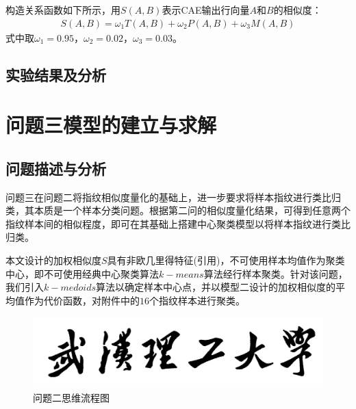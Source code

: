 \documentclass{whutmod}
\begin{document}
			构造关系函数如下所示，用$S(A,B)$表示CAE输出行向量$A$和$B$的相似度：
			\begin{gather}
			S(A,B)=\omega_1 T(A,B)+\omega_2 P(A,B)+\omega_3 M(A,B)
			\end{gather}
			式中取$\omega_1=0.95$，$\omega_2=0.02$，$\omega_3=0.03$。



        \subsection{实验结果及分析}
        


    \section{问题三模型的建立与求解}

  	\subsection{问题描述与分析}
  	问题三在问题二将指纹相似度量化的基础上，进一步要求将样本指纹进行类比归类，其本质是一个样本分类问题。根据第二问的相似度量化结果，可得到任意两个指纹样本间的相似程度，即可在其基础上搭建中心聚类模型以将样本指纹进行类比归类。
  	
    本文设计的加权相似度$S$具有非欧几里得特征(引用)，不可使用样本均值作为聚类中心，即不可使用经典中心聚类算法$k-means$算法经行样本聚类。针对该问题，我们引入$k-medoids$算法以确定样本中心点，并以模型二设计的加权相似度的平均值作为代价函数，对附件中的$16$个指纹样本进行聚类。
  	
  	\begin{figure}[H]
  		\centering
  		\includegraphics[width=\textwidth]{figures/whut.jpg}
  		\caption{问题二思维流程图}\label{lsssscst}
  	\end{figure}
\end{document}
